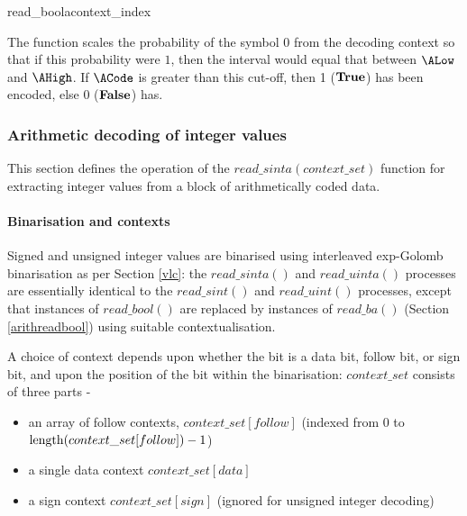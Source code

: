 \begin{pseudo}{read\_boola}{context\_index}
\bsELSE
\bsEND
{}
\bsEND
{}
\end{pseudo}

\begin{informative}
The function scales the probability of the symbol $0$ from the decoding context
so that if this probability were $1$, then the interval would equal that between
 $\ALow$ and $\AHigh$. If $\ACode$ is greater than this cut-off, then 1 ($\text{\bf{True}}$) has
been encoded, else 0 ($\text{\bf{False}}$) has.
\end{informative}

\subsubsection{Arithmetic decoding of integer values}

\label{arithreadint}

This section defines the operation of the $read\_sinta(context\_set)$ function
 for extracting integer values from a block of arithmetically coded data.

\paragraph{Binarisation and contexts \\}

Signed and unsigned integer values are binarised using interleaved exp-Golomb
 binarisation as per Section \ref{vlc}: the $read\_sinta()$ and $read\_uinta()$
processes are essentially identical to the 
$read\_sint()$ and $read\_uint()$ processes, except that instances of $read\_bool()$ are replaced
by instances of $read\_ba()$ (Section \ref{arithreadbool}) using suitable contextualisation. 

A choice of context depends upon whether the bit is a data bit, follow bit, or sign bit, and upon the 
position of the bit within the binarisation: $context\_set$ consists of three parts -
\begin{itemize}
\item an array of follow contexts, $context\_set[follow]$ (indexed from 0 to 
$\operatorname{length}(context\_set[follow])-1$)
\item a single data context $context\_set[data]$ 
\item a sign context $context\_set[sign]$ (ignored for unsigned integer decoding)
\end{itemize}

